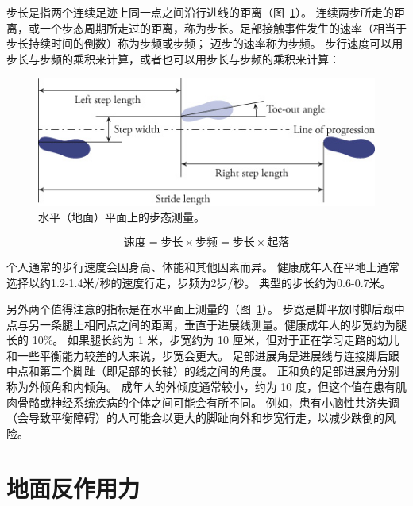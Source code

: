 步长是指两个连续足迹上同一点之间沿行进线的距离（图~\ref{fig:2_3}）。
连续两步所走的距离，或一个步态周期所走过的距离，称为步长。足部接触事件发生的速率（相当于步长持续时间的倒数）称为步频或步频；
迈步的速率称为步频。
步行速度可以用步长与步频的乘积来计算，或者也可以用步长与步频的乘积来计算：


\begin{figure}[!htb]
	\centering
	\includegraphics[width=0.8\linewidth]{chap2/2_3}
	\caption{水平（地面）平面上的步态测量。 \label{fig:2_3}}
\end{figure}

\begin{equation}
	\text{速度} = \text{步长} \times \text{步频}
			    = \text{步长} \times \text{起落}
\end{equation}

个人通常的步行速度会因身高、体能和其他因素而异。
健康成年人在平地上通常选择以约1.2-1.4米/秒的速度行走，步频为2步/秒。
典型的步长约为0.6-0.7米。


另外两个值得注意的指标是在水平面上测量的（图~\ref{fig:2_3}）。
步宽是脚平放时脚后跟中点与另一条腿上相同点之间的距离，垂直于进展线测量。健康成年人的步宽约为腿长的 10\%。
如果腿长约为 1 米，步宽约为 10 厘米，但对于正在学习走路的幼儿和一些平衡能力较差的人来说，步宽会更大。
足部进展角是进展线与连接脚后跟中点和第二个脚趾（即足部的长轴）的线之间的角度。
正和负的足部进展角分别称为外倾角和内倾角。
成年人的外倾度通常较小，约为 10 度，但这个值在患有肌肉骨骼或神经系统疾病的个体之间可能会有所不同。
例如，患有小脑性共济失调（会导致平衡障碍）的人可能会以更大的脚趾向外和步宽行走，以减少跌倒的风险。


\section{地面反作用力}


